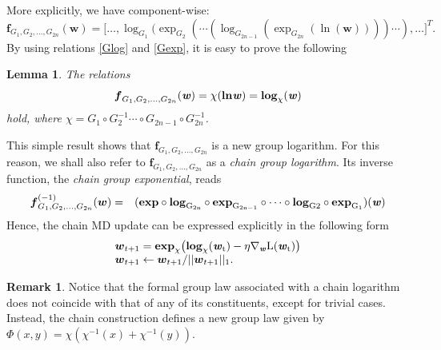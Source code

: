 \documentclass[10pt]{amsart}
\newcommand{\beq}{\begin{equation}}
\newcommand{\eeq}{\end{equation}}
\newcommand{\bea}{\begin{eqnarray}}
\newcommand{\eea}{\end{eqnarray}}
\newcommand{\nn}{\nonumber}
\newcommand{\bi}[1]{\textbf{\textit{#1}}}
\newcommand{\bln}{\rm{\bf{ln}}}
\newcommand{\bexp}{\rm{\bf{exp}}}
\newcommand{\blog}{\rm{\bf{log}}}
\newcommand{\bof}{\boldsymbol{f}}
\newcommand{\bw}{\boldsymbol{w}}
\newtheorem{lemma}{Lemma}
\theoremstyle{definition}
\newtheorem{remark}{\textbf{Remark}}
\theoremstyle{definition}	 %
\begin{document}
More explicitly, we have component-wise:
\beq \nn
\bof_{G_1,G_2,\ldots,G_{2n}}(\bw)=
\big[\ldots, \log_{G_1} (\exp_{G_2}  ( \cdots (\log_{G_{2n-1}} (\exp_{G_{2n}}(\ln (\bw))))\cdots),\ldots\big]^{T}.
\eeq
By using relations \eqref{Glog} and \eqref{Gexp}, it is easy to prove the following
\begin{lemma}
The relations
\beq
\bof_{G_1,G_2,\ldots,G_{2n}}(\bi w)=\chi(\bln \bi w)= \blog_{\chi}(\bi w)
\eeq
hold, where $\chi=G_1\circ G_2^{-1}\cdots\circ G_{2n-1}\circ G_{2n}^{-1}$.
\end{lemma}
This simple result shows that $\bof_{G_1,G_2,\ldots,G_{2n}}$ is a new group logarithm. For this reason, we shall also refer to $\bof_{G_1,G_2,\ldots,G_{2n}}$ as a \textit{chain group logarithm}. Its inverse function, the \textit{chain group exponential}, reads
\bea \nn
\bof^{(-1)}_{G_1,G_2,\ldots,G_{2n}}(\bw)&=& (\bexp\circ \blog_{G_{2n}}  \circ \bexp_{G_{2n-1}} \circ \cdots \circ \blog_{G2} \circ \bexp_{G_1}) (\bi w)\\
\eea
Hence, the chain MD update can be expressed explicitly in the following form
%
\beq	\begin{array}{l}
 \bw_{t+1}%
 = \bexp_{\chi}\big(\blog_{\chi}(\bi w_t) - \eta \nabla_{\bi w} L(\bi w_t)\big) \\
 \bw_{t+1} \leftarrow \bw_{t+1} /||\bw_{t+1}||_1 .
		\label{CMD}
\end{array}
 \eeq



\begin{remark}
Notice that the formal group law associated with a chain logarithm does not coincide with that of any of its constituents, except for trivial cases. Instead, the chain construction defines a new group law given by $\Phi(x,y)= \chi(\chi^{-1}(x)+\chi^{-1}(y))$.
\end{remark}
\end{document}
